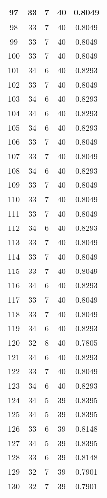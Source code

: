 \documentclass[letterpaper, 12pt]{article}
\begin{document}
\begin{longtable}{|c|c|c|c|c|}
\hline
97 & 33 & 7 & 40 & 0.8049 \\
\hline
98 & 33 & 7 & 40 & 0.8049 \\
\hline
99 & 33 & 7 & 40 & 0.8049 \\
\hline
100 & 33 & 7 & 40 & 0.8049 \\
\hline
101 & 34 & 6 & 40 & 0.8293 \\
\hline
102 & 33 & 7 & 40 & 0.8049 \\
\hline
103 & 34 & 6 & 40 & 0.8293 \\
\hline
104 & 34 & 6 & 40 & 0.8293 \\
\hline
105 & 34 & 6 & 40 & 0.8293 \\
\hline
106 & 33 & 7 & 40 & 0.8049 \\
\hline
107 & 33 & 7 & 40 & 0.8049 \\
\hline
108 & 34 & 6 & 40 & 0.8293 \\
\hline
109 & 33 & 7 & 40 & 0.8049 \\
\hline
110 & 33 & 7 & 40 & 0.8049 \\
\hline
111 & 33 & 7 & 40 & 0.8049 \\
\hline
112 & 34 & 6 & 40 & 0.8293 \\
\hline
113 & 33 & 7 & 40 & 0.8049 \\
\hline
114 & 33 & 7 & 40 & 0.8049 \\
\hline
115 & 33 & 7 & 40 & 0.8049 \\
\hline
116 & 34 & 6 & 40 & 0.8293 \\
\hline
117 & 33 & 7 & 40 & 0.8049 \\
\hline
118 & 33 & 7 & 40 & 0.8049 \\
\hline
119 & 34 & 6 & 40 & 0.8293 \\
\hline
120 & 32 & 8 & 40 & 0.7805 \\
\hline
121 & 34 & 6 & 40 & 0.8293 \\
\hline
122 & 33 & 7 & 40 & 0.8049 \\
\hline
123 & 34 & 6 & 40 & 0.8293 \\
\hline
124 & 34 & 5 & 39 & 0.8395 \\
\hline
125 & 34 & 5 & 39 & 0.8395 \\
\hline
126 & 33 & 6 & 39 & 0.8148 \\
\hline
127 & 34 & 5 & 39 & 0.8395 \\
\hline
128 & 33 & 6 & 39 & 0.8148 \\
\hline
129 & 32 & 7 & 39 & 0.7901 \\
\hline
130 & 32 & 7 & 39 & 0.7901 \\

\end{longtable}
\end{document}

